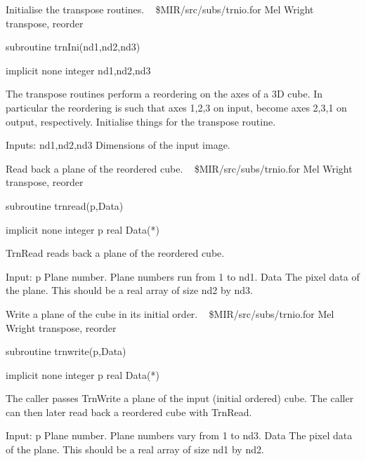 %
\noindent Initialise the transpose routines.
\newline \ 
\newline {} \$MIR/src/subs/trnio.for
\newline {} Mel Wright
\newline {} transpose, reorder
\par{\tenpoint
{\eightpoint\begintt
        subroutine trnIni(nd1,nd2,nd3)

        implicit none
        integer nd1,nd2,nd3

  The transpose routines perform a reordering on the axes of a 3D cube.
  In particular the reordering is such that axes 1,2,3 on input, become
   axes 2,3,1 on output, respectively.
  Initialise things for the transpose routine.

  Inputs:
    nd1,nd2,nd3        Dimensions of the input image.
\endtt}
\par}
%
\noindent Read back a plane of the reordered cube.
\newline \ 
\newline {} \$MIR/src/subs/trnio.for
\newline {} Mel Wright
\newline \abox{Keywords:} transpose, reorder
\par{\tenpoint
{\eightpoint\begintt
        subroutine trnread(p,Data)

        implicit none
        integer p
        real Data(*)

  TrnRead reads back a plane of the reordered cube.

  Input:
    p          Plane number. Plane numbers run from 1 to nd1.
    Data       The pixel data of the plane. This should be a real array
               of size nd2 by nd3.
\endtt}
\par}
%
\noindent Write a plane of the cube in its initial order.
\newline \ 
\newline {} \$MIR/src/subs/trnio.for
\newline \abox{Responsible:} Mel Wright
\newline {} transpose, reorder
\par{\tenpoint
{\eightpoint\begintt
        subroutine trnwrite(p,Data)

        implicit none
        integer p
        real Data(*)

  The caller passes TrnWrite a plane of the input (initial ordered) cube.
  The caller can then later read back a reordered cube with TrnRead.

  Input:
    p          Plane number. Plane numbers vary from 1 to nd3.
    Data       The pixel data of the plane. This should be a real array
               of size nd1 by nd2.
\endtt}
\par}
